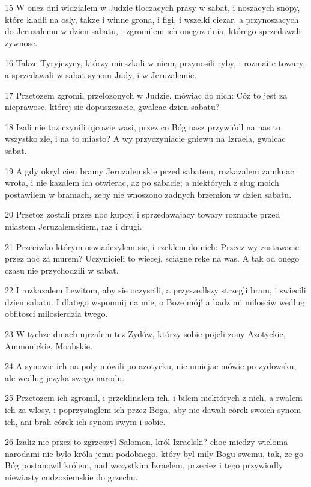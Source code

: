 \par 15 W onez dni widzialem w Judzie tloczacych prasy w sabat, i noszacych snopy, które kladli na osly, takze i winne grona, i figi, i wszelki ciezar, a przynoszacych do Jeruzalemu w dzien sabatu, i zgromilem ich onegoz dnia, którego sprzedawali zywnosc.
\par 16 Takze Tyryjczycy, którzy mieszkali w niem, przynosili ryby, i rozmaite towary, a sprzedawali w sabat synom Judy, i w Jeruzalemie.
\par 17 Przetozem zgromil przelozonych w Judzie, mówiac do nich: Cóz to jest za nieprawosc, której sie dopuszczacie, gwalcac dzien sabatu?
\par 18 Izali nie toz czynili ojcowie wasi, przez co Bóg nasz przywiódl na nas to wszystko zle, i na to miasto? A wy przyczyniacie gniewu na Izraela, gwalcac sabat.
\par 19 A gdy okryl cien bramy Jeruzalemskie przed sabatem, rozkazalem zamknac wrota, i nie kazalem ich otwierac, az po sabacie; a niektórych z slug moich postawilem w bramach, zeby nie wnoszono zadnych brzemion w dzien sabatu.
\par 20 Przetoz zostali przez noc kupcy, i sprzedawajacy towary rozmaite przed miastem Jeruzalemskiem, raz i drugi.
\par 21 Przeciwko którym oswiadczylem sie, i rzeklem do nich: Przecz wy zostawacie przez noc za murem? Uczynicieli to wiecej, sciagne reke na was. A tak od onego czasu nie przychodzili w sabat.
\par 22 I rozkazalem Lewitom, aby sie oczyscili, a przyszedlszy strzegli bram, i swiecili dzien sabatu. I dlatego wspomnij na mie, o Boze mój! a badz mi milosciw wedlug obfitosci milosierdzia twego.
\par 23 W tychze dniach ujrzalem tez Zydów, którzy sobie pojeli zony Azotyckie, Ammonickie, Moabskie.
\par 24 A synowie ich na poly mówili po azotycku, nie umiejac mówic po zydowsku, ale wedlug jezyka swego narodu.
\par 25 Przetozem ich zgromil, i przeklinalem ich, i bilem niektórych z nich, a rwalem ich za wlosy, i poprzysiaglem ich przez Boga, aby nie dawali córek swoich synom ich, ani brali córek ich synom swym i sobie.
\par 26 Izaliz nie przez to zgrzeszyl Salomon, król Izraelski? choc miedzy wieloma narodami nie bylo króla jemu podobnego, który byl mily Bogu swemu, tak, ze go Bóg postanowil królem, nad wszystkim Izraelem, przeciez i tego przywiodly niewiasty cudzoziemskie do grzechu.

